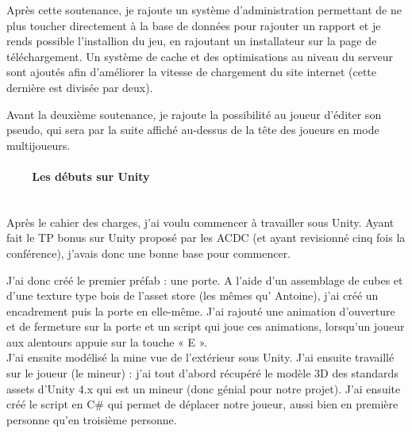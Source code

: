 \documentclass[titlepage, 13px, a4paper]{report}
\begin{document}
Après cette soutenance, je rajoute un système d’administration permettant de ne plus toucher directement 
à la base de données pour rajouter un rapport et je rends possible l’installion du jeu, en rajoutant un 
installateur sur la page de téléchargement. Un système de cache et des optimisations au niveau du serveur 
sont ajoutés afin d’améliorer la vitesse de chargement du site internet (cette dernière est divisée par deux).

Avant la deuxième soutenance, je rajoute la possibilité au joueur d’éditer son pseudo, qui sera par la suite affiché 
au-dessus de la tête des joueurs en mode multijoueurs. \\


\paragraph{~~~~Les débuts sur Unity} \hspace{0pt}     \\
Après le cahier des charges, j’ai voulu commencer à travailler sous Unity. Ayant fait le TP bonus sur 
Unity proposé par les ACDC (et ayant revisionné cinq fois la conférence), j’avais donc une bonne base pour commencer.

J’ai donc créé le premier préfab : une porte.
A l’aide d’un assemblage de cubes et d’une texture type bois de l’asset store (les mêmes qu' Antoine), 
j’ai créé un encadrement puis la porte en elle-même. J’ai rajouté une animation d’ouverture et de fermeture 
sur la porte et un script qui joue ces animations, lorsqu’un joueur aux alentours appuie sur la touche « E ». \\

J’ai ensuite modélisé la mine vue de l’extérieur sous Unity.
J’ai ensuite travaillé sur le joueur (le mineur) : j’ai tout d’abord récupéré le modèle 3D des standards assets d’Unity 4.x 
qui est un mineur (donc génial pour notre projet). J’ai ensuite créé le script en C\# qui permet de déplacer 
notre joueur, aussi bien en première personne qu’en troisième personne. \\
\end{document}
